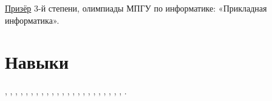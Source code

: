 \documentclass[margin,line]{resume}
\begin{document}
\begin{resume}
  \href{https://alchemmist.github.io/CV/attachments/informatics-olimpic.pdf}{Призёр}
  3-й степени, олимпиады МПГУ по информатике:
  «Прикладная информатика».

  \section{\mysidestyle Навыки}
  ,
      , ,
      ,
      , ,
      , ,
    , ,
      , ,
    , ,
     , ,
      , ,
    , ,
      , , ,
      .

  \end{resume}

  
\end{document}
